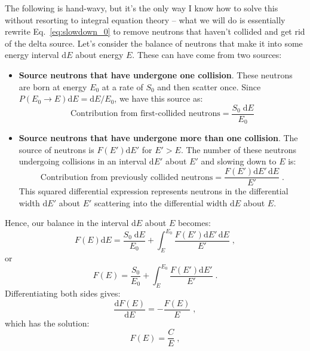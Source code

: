 The following is hand-wavy, but it's the only way I know how to solve this without resorting to integral equation theory -- what we will do is essentially rewrite Eq.~\eqref{eq:slowdown_0} to remove neutrons that haven't collided and get rid of the delta source. Let's consider the balance of neutrons that make it into some energy interval $\mathrm{d}E$ about energy $E$. These can have come from two sources:
\begin{itemize}
    \item \textbf{Source neutrons that have undergone one collision}. These neutrons are born at energy $E_0$ at a rate of $S_0$ and then scatter once. Since $P(E_0\rightarrow E)\mathrm{d}E = \mathrm{d}E/E_0$, we have this source as:
    \begin{equation*}
        \text{Contribution from first-collided neutrons} = \frac{S_0\;\mathrm{d}E}{E_0}
    \end{equation*}
    \item  \textbf{Source neutrons that have undergone more than one collision}. The source of neutrons is $F(E')\mathrm{d}E'$ for $E' > E$. The number of these neutrons undergoing collisions in an interval $\mathrm{d}E'$ about $E'$ and slowing down to $E$ is:
    \begin{equation*}
        \text{Contribution from previously collided neutrons}= \frac{F(E')\mathrm{d}E'\,\mathrm{d}E}{E'}\;\mathrm{.}
    \end{equation*}
    This squared differential expression represents neutrons in the differential width $\mathrm{d}E'$ about $E'$ scattering into the differential width $\mathrm{d}E$ about $E$.
\end{itemize}
 Hence, our balance in the interval $\mathrm{d}E$ about $E$ becomes:
\begin{equation*}
    F(E)\mathrm{d}E = \frac{S_0\;\mathrm{d}E}{E_0} + \int^{E_0}_E\frac{F(E')\mathrm{d}E'\,\mathrm{d}E}{E'}\;\mathrm{,}
\end{equation*}
or
\begin{equation}\label{eq:slowdown_trick}
    F(E) = \frac{S_0}{E_0} + \int^{E_0}_E\frac{F(E')\mathrm{d}E'}{E'}\;\mathrm{.}
\end{equation}
Differentiating both sides gives:
\begin{equation*}
    \frac{\mathrm{d}F(E)}{\mathrm{d}E} = -\frac{F(E)}{E}\;\mathrm{,}
\end{equation*}
which has the solution:
\begin{equation*}
    F(E) = \frac{C}{E}\;\mathrm{,}
\end{equation*}
